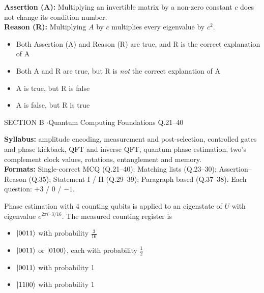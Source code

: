 \documentclass[11pt,a4paper]{article}
\newcommand{\optlabel}[1]{\textbf{(#1)}}
\newenvironment{qitem}[1]{\begin{list}{}{\setlength{\leftmargin}{3.3em}\setlength{\labelwidth}{3.1em}%
  \setlength{\labelsep}{0.2em}\setlength{\topsep}{3pt}\setlength{\parsep}{3pt}}\item[\textbf{Q.#1}\hfill]}{\end{list}}
\newcommand{\qsep}{\par\vspace{2pt}{\color{black!15}\hrule}\vspace{4pt}}
\begin{document}
\begin{qitem}{20}
\textbf{Assertion (A):} Multiplying an invertible matrix by a non-zero constant $c$ does not change its condition number.\\[1mm]
\textbf{Reason (R):} Multiplying $A$ by $c$ multiplies every eigenvalue by $c^2$.
\begin{itemize}[leftmargin=2.6em, labelsep=0.4em, itemsep=2pt, topsep=3pt]
\item[\optlabel{A}] Both Assertion (A) and Reason (R) are true, and R is the correct explanation of A
\item[\optlabel{B}] Both A and R are true, but R is \emph{not} the correct explanation of A
\item[\optlabel{C}] A is true, but R is false
\item[\optlabel{D}] A is false, but R is true
\end{itemize}
\end{qitem}
\qsep

\newpage

\begin{sectionbanner}SECTION B \enspace$\cdot$\enspace Quantum Computing Foundations \hfill Q.21--40\end{sectionbanner}

{\small \textbf{Syllabus:} amplitude encoding, measurement and post-selection, controlled gates and phase kickback, QFT and inverse QFT, quantum phase estimation, two's complement clock values, rotations, entanglement and memory.\\ \textbf{Formats:} Single-correct MCQ (Q.21--40); Matching lists (Q.23--30); Assertion--Reason (Q.35); Statement I / II (Q.29--39); Paragraph based (Q.37--38). Each question: $+3$ / $0$ / $-1$.}
\par\medskip

\begin{qitem}{21}
Phase estimation with 4 counting qubits is applied to an eigenstate of $U$ with eigenvalue $e^{2\pi i\cdot3/16}$. The measured counting register is
\begin{itemize}[leftmargin=2.6em, labelsep=0.4em, itemsep=2pt, topsep=3pt]
\item[\optlabel{A}] $\ket{0011}$ with probability $\tfrac{3}{16}$
\item[\optlabel{B}] $\ket{0011}$ or $\ket{0100}$, each with probability $\tfrac12$
\item[\optlabel{C}] $\ket{0011}$ with probability 1
\item[\optlabel{D}] $\ket{1100}$ with probability 1
\end{itemize}
\end{qitem}
\qsep
\end{document}
